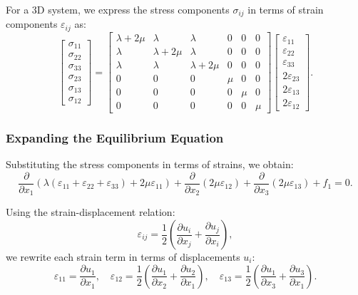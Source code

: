 \documentclass[fleqn,10pt]{olplainarticle}
\begin{document}
For a 3D system, we express the stress components \(\sigma_{ij}\) in terms of strain components \(\varepsilon_{ij}\) as:
\[
\begin{bmatrix}
\sigma_{11} \\
\sigma_{22} \\
\sigma_{33} \\
\sigma_{23} \\
\sigma_{13} \\
\sigma_{12}
\end{bmatrix}
=
\begin{bmatrix}
\lambda + 2 \mu & \lambda & \lambda & 0 & 0 & 0 \\
\lambda & \lambda + 2 \mu & \lambda & 0 & 0 & 0 \\
\lambda & \lambda & \lambda + 2 \mu & 0 & 0 & 0 \\
0 & 0 & 0 & \mu & 0 & 0 \\
0 & 0 & 0 & 0 & \mu & 0 \\
0 & 0 & 0 & 0 & 0 & \mu
\end{bmatrix}
\begin{bmatrix}
\varepsilon_{11} \\
\varepsilon_{22} \\
\varepsilon_{33} \\
2\varepsilon_{23} \\
2\varepsilon_{13} \\
2\varepsilon_{12}
\end{bmatrix}.
\]

\subsubsection{Expanding the Equilibrium Equation}

Substituting the stress components in terms of strains, we obtain:
\[
\frac{\partial}{\partial x_1} \left( \lambda (\varepsilon_{11} + \varepsilon_{22} + \varepsilon_{33}) + 2 \mu \varepsilon_{11} \right) + \frac{\partial}{\partial x_2} (2 \mu \varepsilon_{12}) + \frac{\partial}{\partial x_3} (2 \mu \varepsilon_{13}) + f_1 = 0.
\]

Using the strain-displacement relation:
\[
\varepsilon_{ij} = \frac{1}{2} \left( \frac{\partial u_i}{\partial x_j} + \frac{\partial u_j}{\partial x_i} \right),
\]
we rewrite each strain term in terms of displacements \(u_i\):
\[
\varepsilon_{11} = \frac{\partial u_1}{\partial x_1}, \quad \varepsilon_{12} = \frac{1}{2} \left( \frac{\partial u_1}{\partial x_2} + \frac{\partial u_2}{\partial x_1} \right), \quad \varepsilon_{13} = \frac{1}{2} \left( \frac{\partial u_1}{\partial x_3} + \frac{\partial u_3}{\partial x_1} \right).
\]
\end{document}
